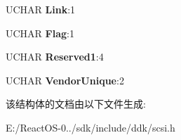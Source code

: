 \begin{DoxyCompactItemize}
\mbox{\label{struct___c_d_b_1_1___c_d_b6_r_e_a_d_w_r_i_t_e_t_a_p_e_a10bddd973d6d2449e05820c05f9f2f28}} 
U\+C\+H\+AR {\bfseries Link}\+:1
\item 
\mbox{\label{struct___c_d_b_1_1___c_d_b6_r_e_a_d_w_r_i_t_e_t_a_p_e_af277cdd8352daf2b77eee2868e5ffba7}} 
U\+C\+H\+AR {\bfseries Flag}\+:1
\item 
\mbox{\label{struct___c_d_b_1_1___c_d_b6_r_e_a_d_w_r_i_t_e_t_a_p_e_a79b8533d0f04a2fdb55f8bb71d4ff96d}} 
U\+C\+H\+AR {\bfseries Reserved1}\+:4
\item 
\mbox{\label{struct___c_d_b_1_1___c_d_b6_r_e_a_d_w_r_i_t_e_t_a_p_e_a397ab11bcabb15c1abea3f8166d8bced}} 
U\+C\+H\+AR {\bfseries Vendor\+Unique}\+:2
\end{DoxyCompactItemize}


该结构体的文档由以下文件生成\+:\begin{DoxyCompactItemize}
\item 
E\+:/\+React\+O\+S-\/0../sdk/include/ddk/scsi.\+h\end{DoxyCompactItemize}
